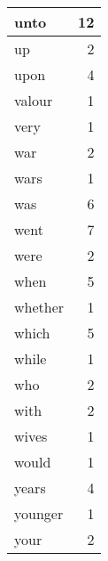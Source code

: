 \begin{center}
\begin{longtable}{l|r}
unto & 12 \\ \hline
up & 2 \\ \hline
upon & 4 \\ \hline
valour & 1 \\ \hline
very & 1 \\ \hline
war & 2 \\ \hline
wars & 1 \\ \hline
was & 6 \\ \hline
went & 7 \\ \hline
were & 2 \\ \hline
when & 5 \\ \hline
whether & 1 \\ \hline
which & 5 \\ \hline
while & 1 \\ \hline
who & 2 \\ \hline
with & 2 \\ \hline
wives & 1 \\ \hline
would & 1 \\ \hline
years & 4 \\ \hline
younger & 1 \\ \hline
your & 2 \\ \hline
\end{longtable}
\end{center}



\normalsize



